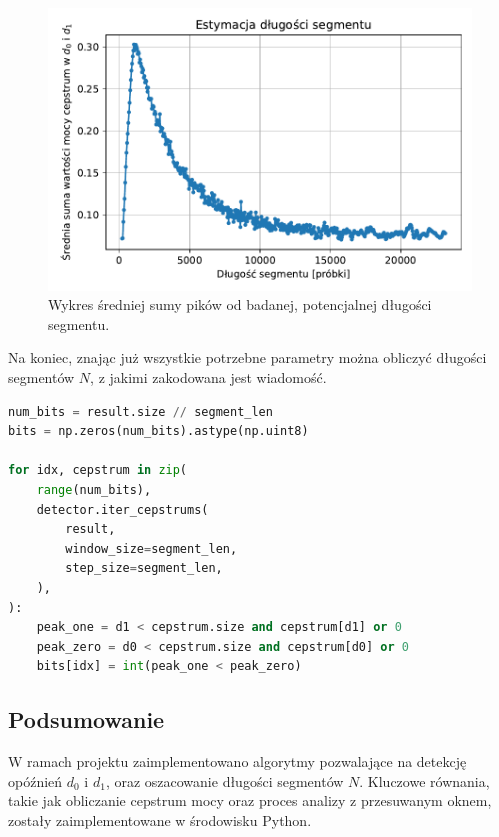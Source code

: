 \begin{figure}[ht!]
	\centering
	\includegraphics[width=\textwidth]{./img/plot_echo_segment_length.pdf}
	\caption{\label{fig:segment-len} Wykres średniej sumy pików od badanej, potencjalnej długości segmentu.}
\end{figure}
\pagebreak

Na koniec, znając już wszystkie potrzebne parametry można obliczyć długości segmentów $N$, z jakimi zakodowana jest wiadomość.

\begin{lstlisting}[language=Python, caption={Ostateczna procedura dekodowania wiadomości.}]
num_bits = result.size // segment_len
bits = np.zeros(num_bits).astype(np.uint8)

for idx, cepstrum in zip(
    range(num_bits),
    detector.iter_cepstrums(
        result,
        window_size=segment_len,
        step_size=segment_len,
    ),
):
    peak_one = d1 < cepstrum.size and cepstrum[d1] or 0
    peak_zero = d0 < cepstrum.size and cepstrum[d0] or 0
    bits[idx] = int(peak_one < peak_zero)
\end{lstlisting}

\subsection{Podsumowanie}

W ramach projektu zaimplementowano algorytmy pozwalające na detekcję opóźnień $d_0$ i $d_1$, oraz oszacowanie długości segmentów $N$. Kluczowe równania, takie jak obliczanie cepstrum mocy oraz proces analizy z przesuwanym oknem, zostały zaimplementowane w środowisku Python.
